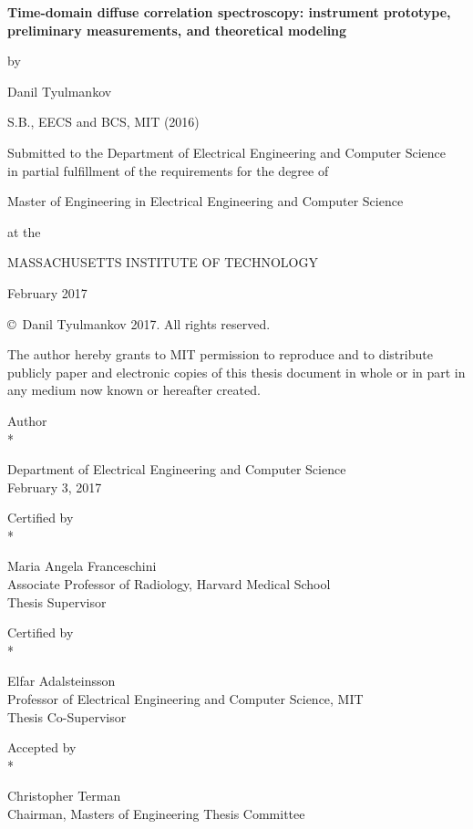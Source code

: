 \def\signature#1#2{\par\noindent#1\dotfill\null\\*{\raggedleft #2\par}}


\begin{titlepage}   
{\Large\bf Time-domain diffuse correlation spectroscopy: instrument prototype, preliminary measurements, and theoretical modeling  \par}
by\par
{\Large  Danil Tyulmankov}
\par
S.B., EECS and BCS, MIT (2016)
\par
Submitted to the Department of Electrical Engineering and Computer Science \\
in partial fulfillment of the requirements for the degree of
\par
Master of Engineering in Electrical Engineering and Computer Science
\par
at the
\par
MASSACHUSETTS INSTITUTE OF TECHNOLOGY
\par
February 2017
\par
\copyright\ Danil Tyulmankov 2017.  All rights reserved.
\par
The author hereby grants to MIT permission to reproduce and to distribute publicly paper and electronic copies of this thesis document in whole or in part in any medium now known or hereafter created.
\baselineskip
\signature{Author}{Department of Electrical Engineering and Computer Science \\ February 3, 2017}
\par
\signature{Certified by}{Maria Angela Franceschini \\ Associate Professor of Radiology, Harvard Medical School\\ Thesis Supervisor}
\par
\signature{Certified by}{Elfar Adalsteinsson \\ Professor of Electrical Engineering and Computer Science, MIT \\ Thesis Co-Supervisor}
\par
\signature{Accepted by}{Christopher Terman \\ Chairman, Masters of Engineering Thesis Committee}
\vfill
\end{titlepage}



